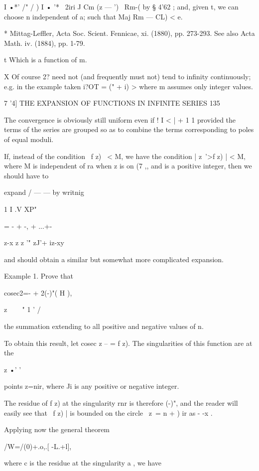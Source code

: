 I •*' /" / ) I • '* \ 2iri J Cm (z — ') \ Rm-( by § 4'62 ; and, given
t, we can choose n independent of a; such that Maj Rm — CL) < e.

* Mittag-Leffler, Acta Soc. Scient. Fennicae, xi. (1880), pp. 273-293.
See also Acta Math. iv. (1884), pp. 1-79.

t Which is a function of m.

X Of course 2? need not (and frequently must not) tend to infinity
continuously; e.g. in the example taken i?OT = (" + i) > where m
assumes only integer values.



7 '4] THE EXPANSION OF FUNCTIONS IN INFINITE SERIES 135

The convergence is obviously still uniform even if ! I < | + 1 1
provided the terms of the series are grouped so as to combine the
terms corresponding to poles of equal moduli.

If, instead of the condition \ f z) \ < M, we have the condition |
z~'>f z) | < M, where M is independent of ra when z is on (7 ,, and is
a positive integer, then we should have to



expand / — — by writnig



1 I .V XP"

= - + -, + ...+-



z-x z z '" zJ'+ iz-xy

and should obtain a similar but somewhat more complicated expansion.

Example 1. Prove that

cosec2=- + 2(-)"( H ),

z \ \ ~ " 1 ' /

the summation extending to all positive and negative values of n.

To obtain this result, let cosec z -- = f z). The singularities of
this function are at the

z •' '

points z=nir, where Ji is any positive or negative integer.

The residue of f z) at the singularity rnr is therefore (-)", and the
reader will easily see that \ f z) | is bounded on the circle \ z\ = n
+ ) ir as - -x .

Applying now the general theorem

/W=/(0)+.o,.[ -L.+l],

where c is the residue at the singularity a , we have



